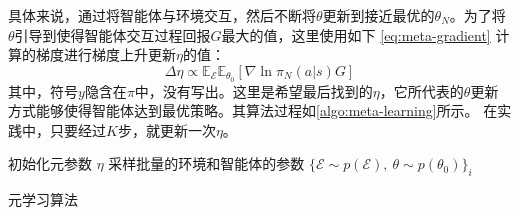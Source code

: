 具体来说，通过将智能体与环境交互，然后不断将$\theta$更新到接近最优的$\theta_N$。为了将$\theta$引导到使得智能体交互过程回报$G$最大的值，这里使用如下 \autoref{eq:meta-gradient} 计算的梯度进行梯度上升更新$\eta$的值：
\begin{equation}
    \Delta \eta  \varpropto \mathbb{E}_{\mathcal{E}} \mathbb{E}_{\theta_0} \left[ \nabla \ln \pi_{N} (a|s) G \right]
    \label{eq:meta-gradient}
\end{equation}
其中，符号$y$隐含在$\pi$中，没有写出。这里是希望最后找到的$\eta$，它所代表的$\theta$更新方式能够使得智能体达到最优策略。其算法过程如\autoref{algo:meta-learning}所示。 在实践中，只要经过$K$步，就更新一次$\eta$。

\begin{algorithm}[h!]
    
    初始化元参数 $\eta$
    采样批量的环境和智能体的参数 $\{ \mathcal{E} \sim p(\mathcal{E}), \ \theta \sim p(\theta_0)\}_i$

     {
    }
    \caption{元学习算法}
    \label{algo:meta-learning}
\end{algorithm}
